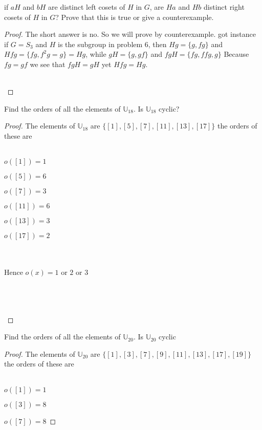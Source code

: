 \documentclass[12pt]{article}
\newenvironment{problem}[2][Problem]{\begin{trivlist}
\item[\hskip \labelsep {\bfseries #1}\hskip \labelsep {\bfseries #2.}]}{\end{trivlist}}
\begin{document}
\begin{problem}{2.4.12}
if $aH$ and $bH$ are distinct left cosets of $H$ in $G$, are $Ha$ and $Hb$ distinct right cosets of $H$ in $G$? Prove that this is true or give a counterexample.
\end{problem}

\begin{proof}
The short answer is no. So we will prove by counterexample. got instance if $G = S_3$ and $H$ is the subgroup in problem 6, then $Hg = \{g,fg\}$ and $Hfg =\{fg,f^2g=g\}=Hg$, while $gH = \{g,gf\}$ and $fgH = \{fg,ffg,g\}$ Because $fg=gf$ we see that $fgH =gH$ yet $Hfg = Hg$. \\ \\
\centerline{}
\end{proof}
 
 \begin{problem}{2.4.13}
Find the orders of all the elements of $\mathbb{U}_{18}$. Is $\mathbb{U}_{18}$ cyclic?
\end{problem}

\begin{proof}
The elements of $\mathbb{U}_{18}$ are $\{[1],[5],[7],[11],[13],[17]\}$ the orders of these are \\ \\
\centerline{$o([1])=1$}
\centerline{$o([5])=6$}
\centerline{$o([7])=3$}
\centerline{$o([11])=6$}
\centerline{$o([13])=3$}
\centerline{$o([17])=2$} \\ \\
Hence $o(x)=1$ or $2$ or $3$ \\ \\
\centerline{} \\ \\

\end{proof}

\begin{problem}{2.4.14}
Find the orders of all the elements of $\mathbb{U}_{20}$. Is $\mathbb{U}_{20}$ cyclic
\end{problem}

\begin{proof}
The elements of $\mathbb{U}_{20}$ are $\{[1],[3],[7],[9],[11],[13],[17],[19]\}$ the orders of these are \\ \\
\centerline{$o([1])=1$}
\centerline{$o([3])=8$}
\centerline{$o([7])=8$}
\end{proof}
\end{document}
